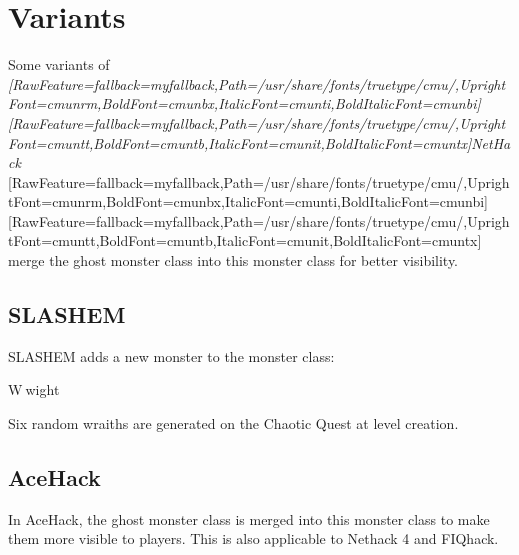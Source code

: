 \documentclass[fontsize=11pt,paper=A4,BCOR=12mm,DIV=13,open=any,listof=totoc,toc=flat]{scrbook}
\begin{document}
\section{Variants}
\label{3}
Some variants of {\itshape \allowbreak{}\setmainfont{cmunti.ttf}[RawFeature={fallback=myfallback},Path=/usr/share/fonts/truetype/cmu/,UprightFont=cmunrm,BoldFont=cmunbx,ItalicFont=cmunti,BoldItalicFont=cmunbi]\setmonofont{cmunti.ttf}[RawFeature={fallback=myfallback},Path=/usr/share/fonts/truetype/cmu/,UprightFont=cmuntt,BoldFont=cmuntb,ItalicFont=cmunit,BoldItalicFont=cmuntx]\itshape NetHack}{$\text{ }$}\allowbreak{}\setmainfont{cmunrm.ttf}[RawFeature={fallback=myfallback},Path=/usr/share/fonts/truetype/cmu/,UprightFont=cmunrm,BoldFont=cmunbx,ItalicFont=cmunti,BoldItalicFont=cmunbi]\setmonofont{cmunrm.ttf}[RawFeature={fallback=myfallback},Path=/usr/share/fonts/truetype/cmu/,UprightFont=cmuntt,BoldFont=cmuntb,ItalicFont=cmunit,BoldItalicFont=cmuntx] merge the ghost\footnotemark[27] monster class into this monster class for better visibility.



\subsection{SLASH\textquotesingle{}EM}
\label{4}
SLASH\textquotesingle{}EM\footnotemark[28] adds a new monster to the monster class:




\begin{myitemize}\item{}W{\mbox{$~$}}wight\footnotemark[29]
\end{myitemize}

Six random wraiths are generated on the Chaotic Quest\footnotemark[30] at level creation.



\subsection{AceHack}
\label{5}
In AceHack\footnotemark[31], the ghost monster class is merged into this monster class to make them more visible to players. This is also applicable to Nethack 4\footnotemark[32] and FIQhack\footnotemark[33].
\end{document}
